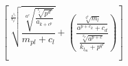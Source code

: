 \documentclass[10pt,a4paper]{report}
\author{Vezetéknév Keresztnév}
\begin{document}
\begin{Huge}
$$ \left[\sqrt[\frac{a^{3_k}}{k_{p^c}}]{\frac{\sqrt[a^c]{\frac{\sqrt[c_j]{p^{d^c}}}{a_{k+c^p}}}}{m_{pl}+c_l}}+\left(\frac{\frac{\sqrt[q^4]{m_l}}{a^{p+c_k}+c_d}}{\frac{\sqrt[x_p]{a^{p+c}}}{k_{l_m}+p^{q^r}}}\right)\right]$$
\end{Huge}
\end{document}

